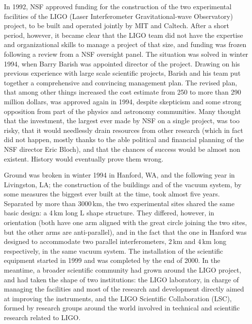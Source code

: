 In 1992, NSF approved funding for the construction of the two experimental facilities of the LIGO (Laser Interferometer Gravitational-wave Observatory) project\cite{Abramovici_1992}, to be built and operated jointly by MIT and Caltech.
After a short period, however, it became clear that the LIGO team did not have the expertise and organizational skills to manage a project of that size, and funding was frozen following a review from a NSF oversight panel.
The situation was solved in winter 1994, when Barry Barish was appointed director of the project. Drawing on his previous experience with large scale scientific projects, Barish and his team put together a comprehensive and convincing management plan.
The revised plan, that among other things increased the cost estimate from 250 to more than 290 million dollars, was approved again in 1994, despite skepticism and some strong opposition from part of the physics and astronomy communities. 
Many thought that the investment, the largest ever made by NSF on a  single project, was too risky, that it would needlessly drain resources from other research (which in fact did not happen, mostly thanks to the able political and financial planning of the NSF director Eric Bloch), and that the chances of success would be almost non existent.
History would eventually prove them wrong.

Ground was broken in winter 1994 in Hanford, WA, and the following year in Livingston, LA; 
the construction of the buildings and of the vacuum system, by some measures the biggest 
ever built at the time, took almost five years. Separated by more than 3000\,km, the two 
experimental sites shared the same basic design: a 4\,km long L shape structure. They 
differed, however, in orientation (both have one arm aligned with the great circle joining the two sites, but the other arms are anti-parallel), and in the fact that the one in Hanford was 
designed to accommodate two parallel interferometers, 2\,km and 4\,km long respectively, in the same vacuum system. 
The installation of the scientific equipment started in 1999 and was completed by the end of 2000. 
In the meantime, a broader scientific community had grown around the LIGO project, 
and had taken the shape of two institutions: the LIGO laboratory, in charge of managing 
the facilities and most of the research and development directly aimed at improving the 
instruments, and the LIGO Scientific Collaboration (LSC), formed by research groups 
around the world involved in technical and scientific research related to LIGO.

